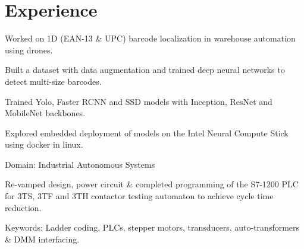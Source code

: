 \documentclass[10pt,letter,sans]{moderncv}        %
\begin{document}
    

\vspace{-2.2em}
\section{Experience}
\vspace{-1.0em}
\begin{itemize} \normalsize{
  
\item[\textbullet] Worked on 1D (EAN-13 \& UPC) barcode localization in warehouse automation using drones.
\item[\textbullet] Built a dataset with data augmentation and trained deep neural networks to detect multi-size barcodes.  
\item[\textbullet] Trained Yolo, Faster RCNN and SSD models with Inception, ResNet and MobileNet backbones.
\item[\textbullet] Explored embedded deployment of models on the Intel Neural Compute Stick using docker in linux.
}
\end{itemize}

\smallskip

\vspace{-1.0em}
\begin{itemize} \normalsize{
  
\item[\textbullet] Domain: Industrial Autonomous Systems
\item[\textbullet] Re-vamped design, power circuit \& completed programming of the S7-1200 PLC for 3TS, 3TF and 3TH contactor testing automaton to achieve cycle time reduction.
\item[\textbullet] Keywords: Ladder coding, PLCs, stepper motors, transducers, auto-transformers \& DMM interfacing.
}

\end{itemize}
\end{document}
